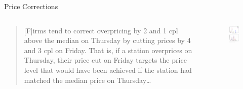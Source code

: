 \documentclass[dvipsnames]{beamer}
\begin{document}
  \begin{frame}{Price Corrections}
    \begin{columns}
      \begin{column}{0.6\textwidth}
        \begin{quote}
          [F]irms tend to correct overpricing by 2 and 1 cpl above the median on Thursday by cutting prices by 4 and 3 cpl on Friday. That is, if a station overprices on Thursday, their price cut on Friday targets the price level that would have been achieved if the station had matched the median price on Thursday\ldots
        \end{quote}
      \end{column}
      \begin{column}{0.5\textwidth}
        \vspace{-4em}
        \begin{figure}[htp]
          \centering
         \includegraphics[height=\textheight, keepaspectratio=true]{fig14.png}
        \end{figure}
      \end{column}
    \end{columns}
  \end{frame}
\end{document}
